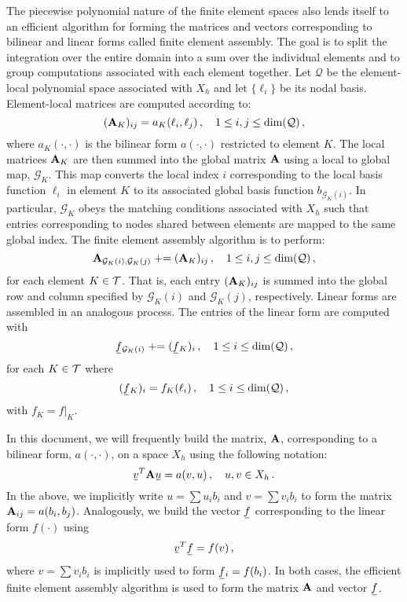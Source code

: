 \documentclass[../doc.tex]{subfiles}
\begin{document}
The piecewise polynomial nature of the finite element spaces also lends itself to an efficient algorithm for forming the matrices and vectors corresponding to bilinear and linear forms called finite element assembly. 
The goal is to split the integration over the entire domain into a sum over the individual elements and to group computations associated with each element together. 
Let $\mathcal{Q}$ be the element-local polynomial space associated with $X_h$ and let $\{\ell_i\}$ be its nodal basis. Element-local matrices are computed according to: 
	\begin{equation}
		(\boldsymbol{\mathrm{A}}_K)_{ij} = a_K(\ell_i, \ell_j) \,, \quad 1 \leq i,j \leq \dim(\mathcal{Q}) \,, 
	\end{equation}
where $a_K(\cdot,\cdot)$ is the bilinear form $a(\cdot,\cdot)$ restricted to element $K$. The local matrices $\boldsymbol{\mathrm{A}}_K$ are then summed into the global matrix $\boldsymbol{\mathrm{A}}$ using a local to global map, $\mathcal{G}_K$. This map converts the local index $i$ corresponding to the local basis function $\ell_i$ in element $K$ to its associated global basis function $b_{\mathcal{G}_K(i)}$. In particular, $\mathcal{G}_K$ obeys the matching conditions associated with $X_h$ such that entries corresponding to nodes shared between elements are mapped to the same global index. The finite element assembly algorithm is to perform: 
	\begin{equation}
		\boldsymbol{\mathrm{A}}_{\mathcal{G}_K(i), \mathcal{G}_K(j)} \mathrel{+}= (\boldsymbol{\mathrm{A}}_K)_{ij} \,, \quad 1\leq i,j \leq \dim(\mathcal{Q}) \,, 
	\end{equation} 
for each element $K \in \mathcal{T}$. That is, each entry $(\boldsymbol{\mathrm{A}}_K)_{ij}$ is summed into the global row and column specified by $\mathcal{G}_K(i)$ and $\mathcal{G}_K(j)$, respectively. Linear forms are assembled in an analogous process. The entries of the linear form are computed with  
	\begin{equation}
		\ubar{f}_{\mathcal{G}_K(i)} \mathrel{+}= (\ubar{f}_K)_i \,, \quad 1 \leq i \leq \dim(\mathcal{Q}) \,,
	\end{equation}
for each $K \in \mathcal{T}$ where 
	\begin{equation}
		(\ubar{f}_K)_i = f_K(\ell_i) \,, \quad 1\leq i \leq \dim(\mathcal{Q}) \,, 
	\end{equation}
with $f_K = f|_K$.  

In this document, we will frequently build the matrix, $\boldsymbol{\mathrm{A}}$, corresponding to a bilinear form, $a(\cdot,\cdot)$, on a space $X_h$ using the following notation: 
	\begin{equation}
		\ubar{v}^T \mat{A} \ubar{u} = a(v,u) \,, \quad u,v \in X_h \,. 
	\end{equation}
In the above, we implicitly write $u = \sum u_i b_i$ and $v = \sum v_i b_i$ to form the matrix $\boldsymbol{\mathrm{A}}_{ij} = a(b_i,b_j)$. Analogously, we build the vector $\ubar{f}$ corresponding to the linear form $f(\cdot)$ using  
	\begin{equation}
		\ubar{v}^T \ubar{f} = f(v) \,, 
	\end{equation}
where $v = \sum v_i b_i$ is implicitly used to form $\ubar{f}_i = f(b_i)$. In both cases, the efficient finite element assembly algorithm is used to form the matrix $\boldsymbol{\mathrm{A}}$ and vector $\ubar{f}$. 
\end{document}
